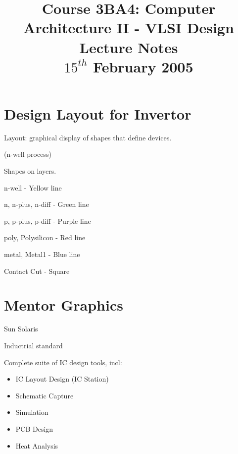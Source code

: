 \documentclass[a4paper,12pt]{article}
\begin{document}
\title{Course 3BA4: Computer Architecture II - VLSI Design \\ Lecture Notes \\ $15^{th}$ February 2005}

\maketitle

\section*{Design Layout for Invertor}

\begin{figure}[h]



\end{figure}

Layout: graphical display of shapes that define devices.


(n-well process)


Shapes on layers.


n-well - Yellow line

n, n-plus, n-diff - Green line

p, p-plus, p-diff - Purple line

poly, Polysilicon - Red line

metal, Metal1 - Blue line

Contact Cut - Square

\begin{figure}[h]


\end{figure}

\section*{Mentor Graphics}

Sun Solaris

Inductrial standard

Complete suite of IC design tools, incl:

\begin{itemize}

\item IC Layout Design (IC Station)

\item Schematic Capture

\item Simulation

\item PCB Design

\item Heat Analysis

\end{itemize}
\end{document}
